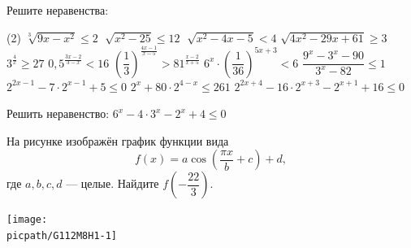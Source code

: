 \begin{homework}[number=1]
	\begin{listofex}
		\item Решите неравенства: %
		\begin{tasks}(2)
			\task \( \sqrt[3]{9x-x^2} \le 2 \)
			\task \( \sqrt[]{x^2-25} \le 12 \)
			\task \( \sqrt[]{x^2-4x-5} < 4 \)
			\task \( \sqrt{4x^2-29x+61} \ge 3 \)
			\task \( 3^{\tfrac{ 4 }{ x }} \ge 27 \)
			\task \( 0,5^{\tfrac{ 3x-2 }{ 3-x }}<16 \)
			\task \( \left( \dfrac{ 1 }{ 3 } \right)^{\tfrac{ 4x-1 }{ x-5 }} > 81^{\tfrac{ x-2 }{ x+5 }} \)
			\task \( 6^x \cdot \left( \dfrac{ 1 }{ 36 } \right)^{5x+3} < 6 \)
			\task \( \dfrac{ 9^x-3^x-90 }{ 3^x-82 } \le 1 \)
			\task \( 2^{2x-1}-7 \cdot 2^{x-1}+5 \le 0 \)
			\task \( 2^x+80 \cdot 2^{4-x} \le 261 \)
			\task \( 2^{2x+4}-16 \cdot 2^{x+3}-2^{x+1}+16 \le 0 \)
			\item Решить неравенство: \( 6^x-4 \cdot 3^x-2^x+4 \le 0 \)
		\end{tasks}
		\item
		\begin{minipage}[t]{\bodywidth}
			На рисунке изображён график функции вида \[ f(x)= a\cos \left( \dfrac{ \pi x }{ b }+c \right)+d, \] где \(a,b,c, d\) --- целые. Найдите \(f\left( -\dfrac{ 22 }{ 3 } \right)\).
		\end{minipage}
		\hspace{0.02\linewidth}
		\begin{minipage}[t]{\picwidth}
			\texttt{[image: \\picpath/G112M8H1-1]}
		\end{minipage}
	\end{listofex}
\end{homework}

